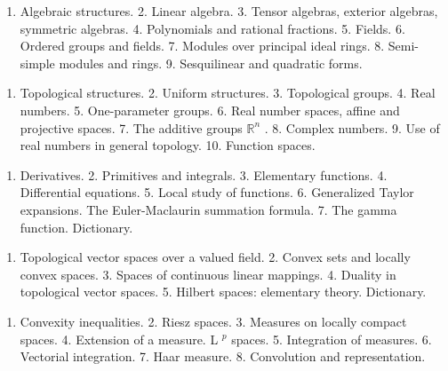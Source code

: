 
\begin{enumerate}
\def\labelenumi{\arabic{enumi}.}
\tightlist
\item
  Algebraic structures. 2. Linear algebra. 3. Tensor algebras, exterior algebras, symmetric algebras. 4. Polynomials and rational fractions. 5. Fields. 6. Ordered groups and fields. 7. Modules over principal ideal rings. 8. Semi-simple modules and rings. 9. Sesquilinear and quadratic forms.
\end{enumerate}


\begin{enumerate}
\def\labelenumi{\arabic{enumi}.}
\tightlist
\item
  Topological structures. 2. Uniform structures. 3. Topological groups. 4. Real numbers. 5. One-parameter groups. 6. Real number spaces, affine and projective spaces. 7. The additive groups \(\mathbb{R}^n\) . 8. Complex numbers. 9. Use of real numbers in general topology. 10. Function spaces.
\end{enumerate}


\begin{enumerate}
\def\labelenumi{\arabic{enumi}.}
\tightlist
\item
  Derivatives. 2. Primitives and integrals. 3. Elementary functions. 4. Differential equations. 5. Local study of functions. 6. Generalized Taylor expansions. The Euler-Maclaurin summation formula. 7. The gamma function. Dictionary.
\end{enumerate}


\begin{enumerate}
\def\labelenumi{\arabic{enumi}.}
\tightlist
\item
  Topological vector spaces over a valued field. 2. Convex sets and locally convex spaces. 3. Spaces of continuous linear mappings. 4. Duality in topological vector spaces. 5. Hilbert spaces: elementary theory. Dictionary.
\end{enumerate}


\begin{enumerate}
\def\labelenumi{\arabic{enumi}.}
\tightlist
\item
  Convexity inequalities. 2. Riesz spaces. 3. Measures on locally compact spaces. 4. Extension of a measure. L \(^{p}\) spaces. 5. Integration of measures. 6. Vectorial integration. 7. Haar measure. 8. Convolution and representation.
\end{enumerate}

